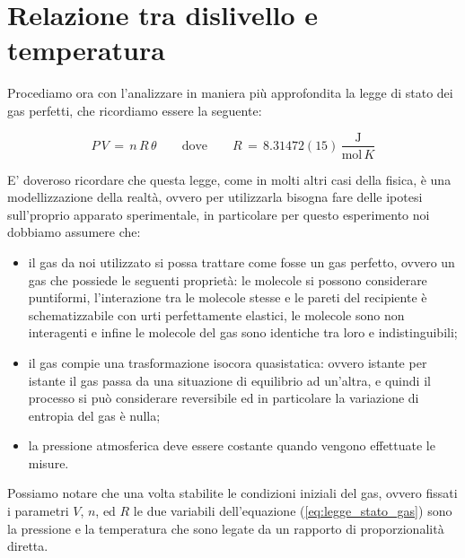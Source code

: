 \section{Relazione tra dislivello e temperatura}

Procediamo ora con l'analizzare in maniera più approfondita la legge di stato dei gas perfetti, che ricordiamo essere la seguente:

\begin{equation*}
    P \, V \,=\, n \, R \, \theta \quad\quad \text{dove} \quad\quad R \,=\, 8.31472(15) \, \frac{\text{J}}{\text{mol} \, K}
\end{equation*}

E' doveroso ricordare che questa legge, come in molti altri casi della fisica, è una modellizzazione della realtà, ovvero per utilizzarla bisogna fare delle ipotesi sull'proprio apparato sperimentale, in particolare per questo esperimento noi dobbiamo assumere che:

\begin{itemize}
	\item{il gas da noi utilizzato si possa trattare come fosse un gas perfetto, ovvero un gas che possiede le seguenti proprietà: le molecole si possono considerare puntiformi, l'interazione tra le molecole stesse e le pareti del recipiente è schematizzabile con urti perfettamente elastici, le molecole sono non interagenti e infine le molecole del gas sono identiche tra loro e indistinguibili;}
	\item{il gas compie una trasformazione isocora quasistatica: ovvero istante per istante il gas passa da una situazione di equilibrio ad un'altra, e quindi il processo si può considerare reversibile ed in particolare la variazione di entropia del gas è nulla;}
	\item{la pressione atmosferica deve essere costante quando vengono effettuate le misure.}
\end{itemize}
%
Possiamo notare che una volta stabilite le condizioni iniziali del gas, ovvero fissati i parametri $V$, $n$, ed $R$ le due variabili dell'equazione (\ref{eq:legge_stato_gas}) sono la pressione e la temperatura che sono legate da un rapporto di proporzionalità diretta. 

